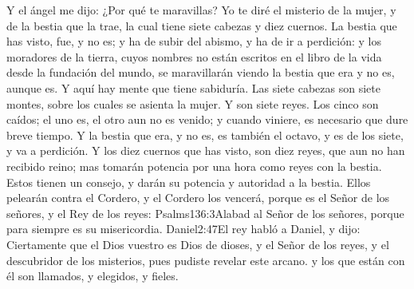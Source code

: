 Y el ángel me dijo: ¿Por qué te maravillas? Yo te diré el misterio de la mujer, y de la bestia que la trae, la cual tiene siete cabezas y diez cuernos. 
La bestia que has visto, fue, y no es; y ha de subir del abismo, y ha de ir a perdición: y los moradores de la tierra, cuyos nombres no están escritos en el libro de la vida desde la fundación del mundo, se maravillarán viendo la bestia que era y no es, aunque es. 
Y aquí hay mente que tiene sabiduría. Las siete cabezas son siete montes, sobre los cuales se asienta la mujer. 
Y son siete reyes. Los cinco son caídos; el uno es, el otro aun no es venido; y cuando viniere, es necesario que dure breve tiempo. 
Y la bestia que era, y no es, es también el octavo, y es de los siete, y va a perdición. 
Y los diez cuernos que has visto, son diez reyes,%
 que aun no han recibido reino; mas tomarán potencia por una hora como reyes con la bestia. 
Estos tienen un consejo, y darán su potencia y autoridad a la bestia. 
Ellos pelearán contra el Cordero, y el Cordero los vencerá, porque es el Señor de los señores, y el Rey de los reyes:%
				  {Psalms}{136:3}{Alabad al Señor de los señores, porque para siempre es su misericordia.}%
				   {Daniel}{2:47}{El rey habló a Daniel, y dijo: Ciertamente que el Dios vuestro es Dios de dioses, y el Señor de los reyes, y el descubridor de los misterios, pues pudiste revelar este arcano.}
 y los que están con él son llamados, y elegidos, y fieles. 

